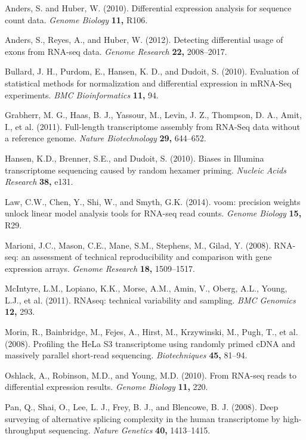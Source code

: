 \documentclass[useAMS,referee]{biom}
\begin{document}
\begin{thebibliography}{}

\bibitem{ } Anders, S. and Huber, W. (2010). Differential expression analysis for sequence count data. \textit{Genome Biology} \textbf{11,} R106.

\bibitem{ } Anders, S., Reyes, A., and Huber, W. (2012). Detecting differential usage of exons from RNA-seq data. \textit{Genome Research} \textbf{22,} 2008–2017.

\bibitem{ } Bullard, J. H., Purdom, E., Hansen, K. D., and Dudoit, S. (2010). Evaluation of statistical methods for normalization and differential expression in mRNA-Seq experiments. \textit{BMC Bioinformatics} \textbf{11,} 94.

\bibitem{ } Grabherr, M. G., Haas, B. J., Yassour, M., Levin, J. Z., Thompson, D. A., Amit, I., et al. (2011). Full-length transcriptome assembly from RNA-Seq data without a reference genome. \textit{Nature Biotechnology} \textbf{29,} 644–652.

\bibitem{ } Hansen, K.D., Brenner, S.E., and Dudoit, S. (2010). Biases in Illumina transcriptome sequencing caused by random hexamer priming. \textit{Nucleic Acids Research} \textbf{38,} e131.

\bibitem{ } Law, C.W., Chen, Y., Shi, W., and Smyth, G.K. (2014). voom: precision weights unlock linear model analysis tools for RNA-seq read counts. \textit{Genome Biology} \textbf{15,} R29.

\bibitem{ } Marioni, J.C., Mason, C.E., Mane, S.M., Stephens, M., Gilad, Y. (2008). RNA-seq: an assessment of technical reproducibility and comparison with gene expression arrays. \textit{Genome Research} \textbf{18,} 1509–1517.

\bibitem{ } McIntyre, L.M., Lopiano, K.K., Morse, A.M., Amin, V., Oberg, A.L., Young, L.J., et al. (2011). RNAseq: technical variability and sampling. \textit{BMC Genomics} \textbf{12,} 293.

\bibitem{ } Morin, R., Bainbridge, M., Fejes, A., Hirst, M., Krzywinski, M., Pugh, T., et al. (2008). Profiling the HeLa S3 transcriptome using randomly primed cDNA and massively parallel short-read sequencing. \textit{Biotechniques} \textbf{45,} 81–94.

\bibitem{ } Oshlack, A., Robinson, M.D., and Young, M.D. (2010). From RNA-seq reads to differential expression results. \textit{Genome Biology} \textbf{11,} 220.

\bibitem{ } Pan, Q., Shai, O., Lee, L. J., Frey, B. J., and Blencowe, B. J. (2008). Deep surveying of alternative splicing complexity in the human transcriptome by high-throughput
sequencing. \textit{Nature Genetics} \textbf{40,} 1413–1415.


\end{thebibliography}
\end{document}
